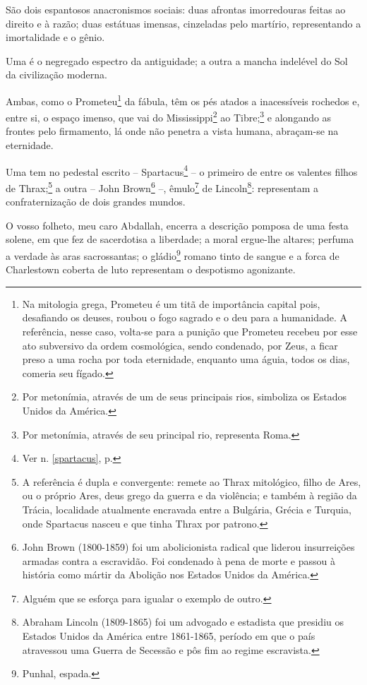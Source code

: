 São dois espantosos anacronismos sociais: duas afrontas imorredouras
feitas ao direito e à razão; duas estátuas imensas, cinzeladas pelo
martírio, representando a imortalidade e o gênio.

Uma é o negregado espectro da antiguidade; a outra a mancha indelével do
Sol da civilização moderna.

Ambas, como o Prometeu\footnote{Na mitologia grega, Prometeu é um titã
  de importância capital pois, desafiando os deuses, roubou o fogo
  sagrado e o deu para a humanidade. A referência, nesse caso, volta-se
  para a punição que Prometeu recebeu por esse ato subversivo da ordem
  cosmológica, sendo condenado, por Zeus, a ficar preso a uma rocha por
  toda eternidade, enquanto uma águia, todos os dias, comeria seu
  fígado.} da fábula, têm os pés atados a inacessíveis rochedos e, entre
si, o espaço imenso, que vai do Mississippi\footnote{Por metonímia,
  através de um de seus principais rios, simboliza os Estados Unidos da
  América.} ao Tibre;\footnote{Por metonímia, através de seu principal
  rio, representa Roma.} e alongando as frontes pelo firmamento, lá
onde não penetra a vista humana, abraçam-se na eternidade.

Uma tem no pedestal escrito -- Spartacus\footnote{Ver n. \ref{spartacus}, p. \pageref{spartacus}} 
-- o primeiro de entre os valentes filhos de
Thrax;\footnote{A referência é dupla e convergente: remete ao Thrax
  mitológico, filho de Ares, ou o próprio Ares, deus grego da guerra e
  da violência; e também à região da Trácia, localidade atualmente
  encravada entre a Bulgária, Grécia e Turquia, onde Spartacus nasceu e
  que tinha Thrax por patrono.} a outra -- John Brown\footnote{John
  Brown (1800-1859) foi um abolicionista radical que liderou
  insurreições armadas contra a escravidão. Foi condenado à pena de
  morte e passou à história como mártir da Abolição nos Estados Unidos
  da América.} --, êmulo\footnote{Alguém que se esforça para igualar o
  exemplo de outro.} de Lincoln\footnote{Abraham Lincoln (1809-1865)
  foi um advogado e estadista que presidiu os Estados Unidos da América
  entre 1861-1865, período em que o país atravessou uma Guerra de
  Secessão e pôs fim ao regime escravista.\label{lincoln}}: representam a
confraternização de dois grandes mundos.

O vosso folheto, meu caro Abdallah, encerra a descrição pomposa de uma
festa solene, em que fez de sacerdotisa a liberdade; a moral ergue-lhe
altares; perfuma a verdade às aras sacrossantas; o gládio\footnote{
  Punhal, espada.} romano tinto de sangue e a forca de Charlestown
coberta de luto representam o despotismo agonizante.

